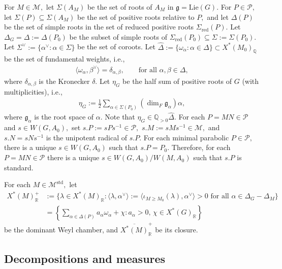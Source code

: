 \documentclass[10pt]{amsart}
\theoremstyle{definition}
\numberwithin{equation}{section}
\numberwithin{equation}{subsection}
\newcommand{\RR}{\mathbb{R}}
\newcommand{\QQ}{\mathbb{Q}}
\begin{document}
For $M\in \mathcal{M},$ let $\Sigma(A_M)$ be the set of roots of $A_M$ in $\mathfrak{g}=\mathrm{Lie}(G).$ For $P\in \mathcal{P},$ let $\Sigma(P)\subseteq \Sigma(A_M)$ be the set of positive roots relative to $P,$ and let $\Delta(P)$ be the set of simple roots in the set of reduced positive roots $\Sigma_{\mathrm{red}}(P)$. Let $\Delta_G=\Delta:=\Delta(P_0)$ be the subset of simple roots of $\Sigma_{\mathrm{red}}(P_0)\subseteq\Sigma:=\Sigma(P_0).$ Let $\Sigma^{\lor}:=\{ \alpha^\lor:\alpha\in \Sigma\}$ be the set of coroots. Let $\widehat{\Delta}:=\{\omega_\alpha:\alpha\in \Delta\}\subset X^\ast(M_0)_\QQ$ be the set of fundamental weights, i.e., 
\begin{align*}
    \langle \omega_\alpha,\beta^\lor\rangle=\delta_{\alpha,\beta}, \quad \quad \textrm{for all } \alpha,\beta\in \Delta,
\end{align*}
where $\delta_{\alpha,\beta}$ is the Kronecker $\delta$.
Let $\eta_G$ be the half sum of positive roots of $G$ (with multiplicities), i.e.,
\begin{align*}
    \eta_G:=\frac{1}{2}\sum_{\alpha\in \Sigma(P_0)} (\dim_F \mathfrak{g}_\alpha)\alpha,
\end{align*}
where $\mathfrak{g}_\alpha$ is the root space of $\alpha.$ Note that $\eta_G\in \QQ_{>0}\widehat{\Delta}.$ For each $P=MN\in \mathcal{P}$ and $s\in W(G,A_0),$ set $s.P:=sPs^{-1}\in \mathcal{P},$  $s.M:=sMs^{-1}\in \mathcal{M},$ and $s.N=sNs^{-1}$ is the unipotent radical of $s.P$. For each minimal parabolic  $P\in\mathcal{P},$ there is a unique $s\in W(G,A_0)$ such that $s. P=P_0$. Therefore, for each $P=MN\in \mathcal{P}$ there is a unique $s\in W(G,A_0)/W(M,A_0)$ such that $s.P$ is standard.

For each $M\in \mathcal{M}^{\mathrm{std}},$ let
\begin{align*}
    X^*(M)^+_\RR &:= \{\lambda\in X^*(M)_\RR : \langle \lambda,\alpha^\lor\rangle:=\langle \iota_{M\ge M_0}(\lambda),\alpha^\lor\rangle > 0\text{ for all }\alpha\in \Delta_G-\Delta_M\}\\
    &=\left\{\sum_{\alpha\in \Delta(P)} a_\alpha\omega_\alpha+\chi: a_\alpha>0,\,\chi\in X^{\ast}(G)_\RR\right\}
\end{align*}
be the dominant Weyl chamber, and $\overline{X^\ast(M)}^+_\RR$ be its closure. 



\subsection{Decompositions and measures}\label{subsec:Cartan} 
\end{document}
